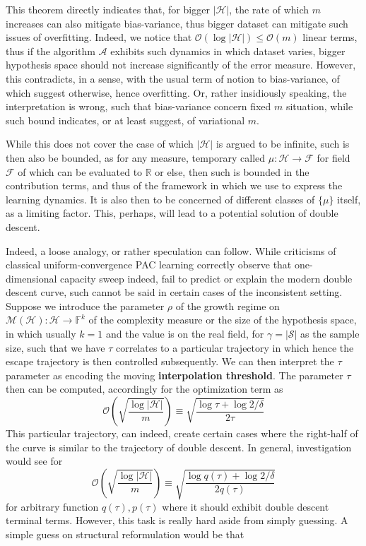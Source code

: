 This theorem directly indicates that, for bigger $|\mathcal{H}|$, the rate of which $m$ increases can also mitigate bias-variance, thus bigger dataset can mitigate such issues of overfitting. Indeed, we notice that $\mathcal{O}(\log{|\mathcal{H}|})\leq\mathcal{O}(m)$ linear terms, thus if the algorithm $\mathcal{A}$ exhibits such dynamics in which dataset varies, bigger hypothesis space should not increase significantly of the error measure. However, this contradicts, in a sense, with the usual term of notion to bias-variance, of which suggest otherwise, hence overfitting. Or, rather insidiously speaking, the interpretation is wrong, such that bias-variance concern fixed $m$ situation, while such bound indicates, or at least suggest, of variational $m$. 

While this does not cover the case of which $|\mathcal{H}|$ is argued to be infinite, such is then also be bounded, as for any measure, temporary called $\mu: \mathcal{H}\to \mathcal{F}$ for field $\mathcal{F}$ of which can be evaluated to $\mathbb{R}$ or else, then such is bounded in the contribution terms, and thus of the framework in which we use to express the learning dynamics. It is also then to be concerned of different classes of $\{\mu\}$ itself, as a limiting factor. This, perhaps, will lead to a potential solution of double descent. 

Indeed, a loose analogy, or rather speculation can follow. While criticisms of classical uniform-convergence PAC learning correctly observe that one-dimensional capacity sweep indeed, fail to predict or explain the modern double descent curve, such cannot be said in certain cases of the inconsistent setting. Suppose we introduce the parameter $\rho$ of the growth regime on $\mathcal{M}(\mathcal{H}):\mathcal{H}\to \mathbb{F}^{k}$ of the complexity measure or the size of the hypothesis space, in which usually $k=1$ and the value is on the real field, for $\gamma=|\mathcal{S}|$ as the sample size, such that we have $\tau$ correlates to a particular trajectory in which 
hence the escape trajectory is then controlled subsequently. We can then interpret the $\tau$ parameter as encoding the moving \textbf{interpolation threshold}. The parameter $\tau$ then can be computed, accordingly for the optimization term as 
\begin{equation}
    \mathcal{O}\left(\sqrt{\frac{\log{|\mathcal{H}|}}{m}}\right) \equiv \sqrt{\frac{\log{\tau}+ \log{2/\delta}}{2\tau}}
\end{equation}
This particular trajectory, can indeed, create certain cases where the right-half of the curve is similar to the trajectory of double descent. In general, investigation would see for 
\begin{equation}
    \mathcal{O}\left(\sqrt{\frac{\log{|\mathcal{H}|}}{m}}\right) \equiv \sqrt{\frac{\log{q(\tau)}+ \log{2/\delta}}{2q(\tau)}}
\end{equation}
for arbitrary function $q(\tau),p(\tau)$ where it should exhibit double descent terminal terms. However, this task is really hard aside from simply guessing. A simple guess on structural reformulation would be that 

